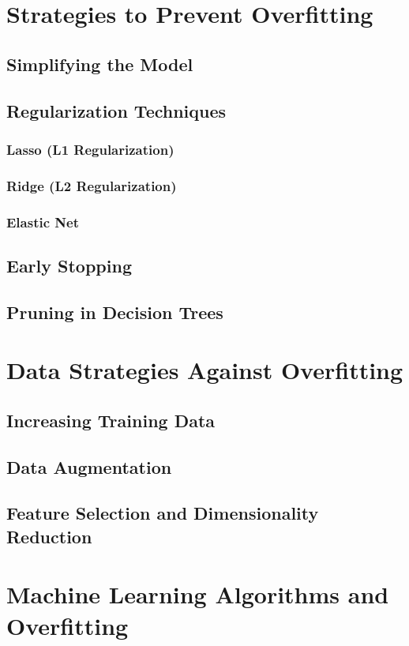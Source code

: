 \documentclass[12pt]{book} %
\begin{document}
\section{Strategies to Prevent Overfitting}
\subsection{Simplifying the Model}
\subsection{Regularization Techniques}
\subsubsection{Lasso (L1 Regularization)}
\subsubsection{Ridge (L2 Regularization)}
\subsubsection{Elastic Net}
\subsection{Early Stopping}
\subsection{Pruning in Decision Trees}

\section{Data Strategies Against Overfitting}
\subsection{Increasing Training Data}
\subsection{Data Augmentation}
\subsection{Feature Selection and Dimensionality Reduction}

\section{Machine Learning Algorithms and Overfitting}
\end{document}
